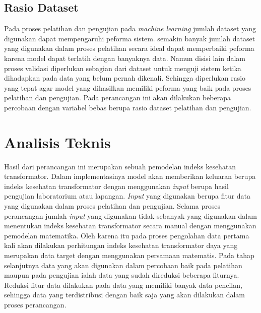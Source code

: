 \subsection{Rasio Dataset}
Pada proses pelatihan dan pengujian pada \textit{machine learning} jumlah dataset yang digunakan dapat mempengaruhi peforma sistem. semakin banyak jumlah dataset yang digunakan dalam proses pelatihan secara ideal dapat memperbaiki peforma karena model dapat terlatih dengan banyaknya data. Namun disisi lain dalam proses validasi diperlukan sebagian dari dataset untuk menguji sistem ketika dihadapkan pada data yang belum pernah dikenali. Sehingga diperlukan rasio yang tepat agar model yang dihasilkan memiliki peforma yang baik pada proses pelatihan dan pengujian. Pada perancangan ini akan dilakukan beberapa percobaan dengan variabel bebas berupa rasio dataset pelatihan dan pengujian.

\section{Analisis Teknis}

Hasil dari perancangan ini merupakan sebuah pemodelan indeks kesehatan transformator. Dalam implementasinya model akan memberikan keluaran berupa indeks kesehatan transformator dengan menggunakan \textit{input} berupa hasil pengujian laboratorium atau lapangan. \textit{Input} yang digunakan berupa fitur data yang digunakan dalam proses pelatihan dan pengujian. Selama proses perancangan jumlah \textit{input} yang digunakan tidak sebanyak yang digunakan dalam menentukan indeks kesehatan transformator secara manual dengan menggunakan pemodelan matematika. Oleh karena itu pada proses pengolahan data pertama kali akan dilakukan perhitungan indeks kesehatan transformator daya yang merupakan data target dengan menggunakan persamaan matematis. Pada tahap selanjutnya data yang akan digunakan dalam percobaan baik pada pelatihan maupun pada pengujian ialah data yang sudah direduksi beberapa fiturnya. Reduksi fitur data dilakukan pada data yang memiliki banyak data pencilan, sehingga data yang terdistribusi dengan baik saja yang akan dilakukan dalam proses perancangan. \par

